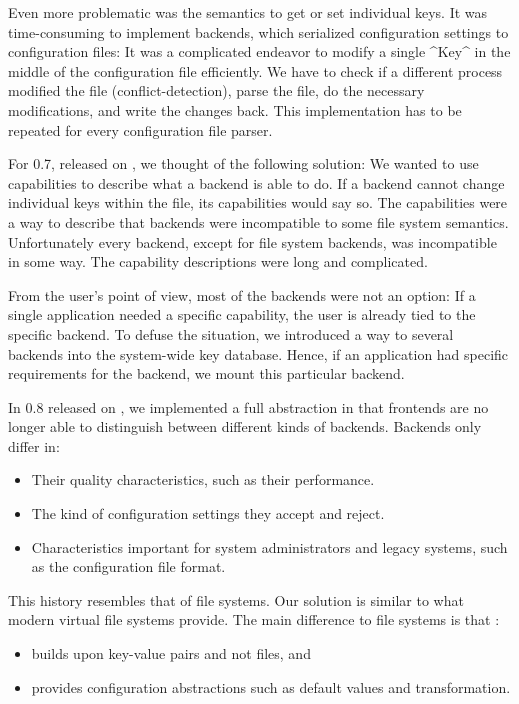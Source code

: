 Even more problematic was the semantics to get or set individual keys.
It was time-consuming to implement backends, which serialized configuration settings to configuration files:
It was a complicated endeavor to modify a single ^Key^ in the middle of the configuration file efficiently.
We have to check if a different process modified the file (conflict-detection), parse the file, do the necessary modifications, and write the changes back.
This implementation has to be repeated for every configuration file parser.

For \elektra{} 0.7, released on , we thought of the following solution:
We wanted to use capabilities to describe what a backend is able to do.
If a backend cannot change individual keys within the file, its capabilities would say so.
The capabilities were a way to describe that backends were incompatible to some file system semantics.
Unfortunately every backend, except for file system backends, was incompatible in some way.
The capability descriptions were long and complicated.

From the user's point of view, most of the backends were not an option:
If a single application needed a specific capability, the user is already tied to the specific backend.
To defuse the situation, we introduced a way to  several backends into the system-wide key database.
Hence, if an application had specific requirements for the backend, we mount this particular backend.

In \elektra{} 0.8 released on , we implemented a full abstraction in that frontends are no longer able to distinguish between different kinds of backends.
Backends only differ in:
\begin{itemize}
\item Their quality characteristics, such as their performance.
\item The kind of configuration settings they accept and reject.
\item Characteristics important for system administrators and legacy systems, such as the configuration file format.
\end{itemize}


This history resembles that of file systems.
Our solution is similar to what modern virtual file systems provide.
The main difference to file systems is that \elektra{}:
\begin{itemize}
\item
builds upon key-value pairs and not files, and
\item
provides configuration abstractions such as default values and transformation.
\end{itemize}





